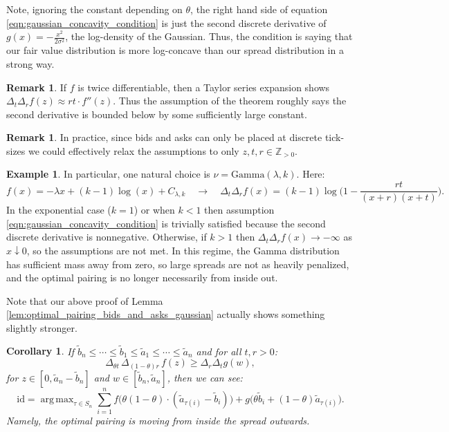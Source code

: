 \documentclass[11pt]{article}
\theoremstyle{plain}
\newtheorem{corollary}[theorem]{Corollary}
\theoremstyle{definition}
\newtheorem{example}[theorem]{Example}
\newtheorem{remark}[theorem]{Remark}
\numberwithin{equation}{section}
\DeclareMathOperator*{\argmax}{arg\,max}
\begin{document}
\noindent Note, ignoring the constant depending on $\theta$, the right hand side of equation \eqref{eqn:gaussian_concavity_condition} is just the second
discrete derivative of $g(x) = -\frac{x^2}{2\sigma^2}$, the log-density of the Gaussian. Thus, the
condition is saying that our fair value distribution is more log-concave than our spread distribution in a strong way.

\begin{remark}
    If $f$ is twice differentiable, then a Taylor series expansion shows
     $\Delta_t \Delta_r f(z) \approx rt \cdot f''(z)$. Thus the
     assumption of the theorem roughly says the second derivative is bounded
     below by some sufficiently large constant.
\end{remark}

\begin{remark}
    In practice, since bids and asks can only be placed at discrete tick-sizes
    we could effectively relax the assumptions to only $z,t,r \in \mathbb{Z}_{> 0}$.
\end{remark}

\begin{example}
    In particular, one natural choice is $\nu = \mathrm{Gamma}(\lambda, k)$. Here:
    \[f(x) = -\lambda x + (k-1) \log(x) + C_{\lambda, k} \quad \to \quad \Delta_t\Delta_r f(x) = (k-1) \log\bigg(1 - \frac{rt}{(x+r)(x+t)}\bigg). \]
    \noindent In the exponential case ($k=1$) or when $k < 1$ then assumption
     \eqref{eqn:gaussian_concavity_condition} is trivially satisfied because
     the second discrete derivative is nonnegative. Otherwise, if $k > 1$ then $\Delta_t \Delta_r f(x) \to - \infty$ as $x \downarrow 0$,
     so the assumptions are not met. In this regime, the Gamma distribution has sufficient mass away from zero, so
     large spreads are not as heavily penalized, and the optimal pairing is no longer necessarily from inside out.
\end{example}

\noindent Note that our above proof of Lemma \ref{lem:optimal_pairing_bids_and_asks_gaussian} actually shows something slightly stronger.

\begin{corollary}
    If $\widetilde b_n \leq \cdots \leq \widetilde b_1 \leq \widetilde a_1 \leq \cdots \leq \widetilde a_n$ and for all $t,r > 0$:
    \[\Delta_{\theta t} \, \Delta_{(1-\theta) r} \, f(z) \geq \Delta_{r} \Delta_{t} g(w),\]
    \noindent for $z \in [0, \widetilde a_n-\widetilde b_n]$ and $w \in [\widetilde b_n,\widetilde a_n]$, then we can see:
    \[\mathrm{id} = \argmax_{\tau \in S_n} \sum_{i=1}^n f\Big(\theta(1-\theta) \cdot (\widetilde a_{\tau(i)} - \widetilde b_i) \Big ) + g\Big(\theta \widetilde b_i + (1-\theta) \widetilde a_{\tau(i)}\Big). \]
    \noindent Namely, the optimal pairing is moving from inside the spread outwards.
        \label{cor:optimal_pairing_bids_and_asks_general}
\end{corollary}
\end{document}
